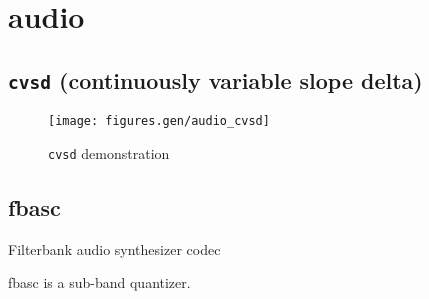 % 
%
\section{audio}
\label{module:audio}

\subsection{{\tt cvsd} (continuously variable slope delta)}
\label{module:audio:cvsd}

\begin{figure}
\centering
  \texttt{[image: figures.gen/audio\_cvsd]}
\caption{{\tt cvsd} demonstration}
\label{fig:module:audio:cvsd}
\end{figure}

\subsection{fbasc}
\label{module:audio:fbasc}
Filterbank audio synthesizer codec

fbasc is a sub-band quantizer.

